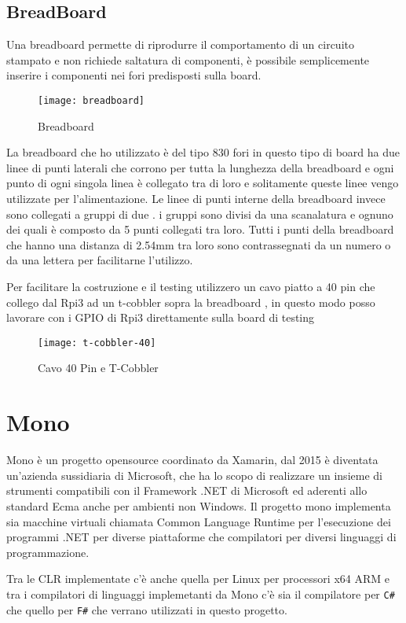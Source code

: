 \subsection{BreadBoard}
Una breadboard permette di riprodurre il comportamento di un circuito stampato e non richiede saltatura di componenti, è possibile semplicemente inserire i componenti nei fori predisposti sulla board.
\begin{figure}[htbp!] 
	\centering    
	\texttt{[image: breadboard]}
	\caption[Breadboard]{Breadboard}
	\label{fig:breadboard}
\end{figure}
La breadboard che ho utilizzato è del tipo 830 fori in questo tipo di board ha due linee di punti laterali che corrono per tutta la lunghezza della breadboard e ogni punto di ogni singola linea è collegato tra di loro e solitamente queste linee vengo utilizzate per l’alimentazione. 
Le linee di punti interne della breadboard invece sono collegati a gruppi di due . i gruppi sono divisi da una scanalatura e ognuno dei quali è composto da 5 punti collegati tra loro.
Tutti i punti della breadboard che hanno una distanza di 2.54mm tra loro sono contrassegnati da un numero o da una lettera per facilitarne l'utilizzo.

Per facilitare la costruzione e il testing utilizzero un cavo piatto a 40 pin che collego dal Rpi3 ad un  t-cobbler sopra la breadboard , in questo modo posso lavorare con i GPIO di Rpi3 direttamente sulla board di testing
 

\begin{figure}[htbp!] 
	\centering    
	\texttt{[image: t-cobbler-40]}
	\caption[t-cobbler-40]{Cavo 40 Pin e T-Cobbler}
	\label{fig:t-cobbler-40}
\end{figure}

\section{Mono}
Mono è un progetto opensource coordinato da Xamarin, dal 2015 è diventata un'azienda sussidiaria di Microsoft, che ha lo scopo di realizzare  un insieme di strumenti compatibili con il Framework .NET di Microsoft ed aderenti allo standard Ecma anche per ambienti non Windows.
Il progetto mono implementa sia macchine virtuali chiamata Common Language Runtime per l'esecuzione dei programmi .NET per diverse piattaforme che compilatori per diversi linguaggi di programmazione.

Tra le CLR implementate c'è anche quella per Linux per processori x64 ARM e tra i compilatori di linguaggi implemetanti da Mono c'è sia il compilatore per \texttt{C\#} che quello per \texttt{F\#} che verrano utilizzati in questo progetto.

